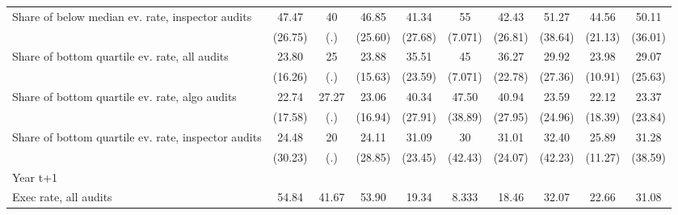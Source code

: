 {\begin{tabular}{l*{9}{c}}
Share of below median ev. rate, inspector audits&       47.47         &          40         &       46.85         &       41.34         &          55         &       42.43         &       51.27         &       44.56         &       50.11         \\
            &     (26.75)         &         (.)         &     (25.60)         &     (27.68)         &     (7.071)         &     (26.81)         &     (38.64)         &     (21.13)         &     (36.01)         \\
Share of bottom quartile ev. rate, all audits&       23.80         &          25         &       23.88         &       35.51         &          45         &       36.27         &       29.92         &       23.98         &       29.07         \\
            &     (16.26)         &         (.)         &     (15.63)         &     (23.59)         &     (7.071)         &     (22.78)         &     (27.36)         &     (10.91)         &     (25.63)         \\
Share of bottom quartile ev. rate, algo audits&       22.74         &       27.27         &       23.06         &       40.34         &       47.50         &       40.94         &       23.59         &       22.12         &       23.37         \\
            &     (17.58)         &         (.)         &     (16.94)         &     (27.91)         &     (38.89)         &     (27.95)         &     (24.96)         &     (18.39)         &     (23.84)         \\
Share of bottom quartile ev. rate, inspector audits&       24.48         &          20         &       24.11         &       31.09         &          30         &       31.01         &       32.40         &       25.89         &       31.28         \\
            &     (30.23)         &         (.)         &     (28.85)         &     (23.45)         &     (42.43)         &     (24.07)         &     (42.23)         &     (11.27)         &     (38.59)         \\
Year t+1    &                     &                     &                     &                     &                     &                     &                     &                     &                     \\
Exec rate, all audits&       54.84         &       41.67         &       53.90         &       19.34         &       8.333         &       18.46         &       32.07         &       22.66         &       31.08         \\

\end{tabular}}

